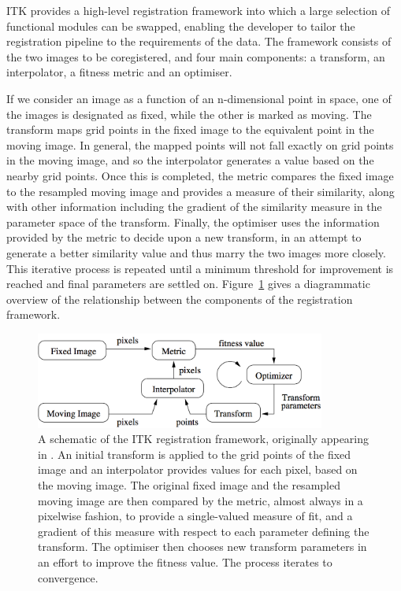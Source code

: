     ITK provides a high-level registration framework into which a large selection of functional modules can be swapped, enabling the developer to tailor the registration pipeline to the requirements of the data. The framework consists of the two images to be coregistered, and four main components: a transform, an interpolator, a fitness metric and an optimiser.

    If we consider an image as a function of an n-dimensional point in space, one of the images is designated as fixed, while the other is marked as moving. The transform maps grid points in the fixed image to the equivalent point in the moving image. In general, the mapped points will not fall exactly on grid points in the moving image, and so the interpolator generates a value based on the nearby grid points. Once this is completed, the metric compares the fixed image to the resampled moving image and provides a measure of their similarity, along with other information including the gradient of the similarity measure in the parameter space of the transform. Finally, the optimiser uses the information provided by the metric to decide upon a new transform, in an attempt to generate a better similarity value and thus marry the two images more closely. This iterative process is repeated until a minimum threshold for improvement is reached and final parameters are settled on. Figure~\ref{fig:framework} gives a diagrammatic overview of the relationship between the components of the registration framework.

    \begin{figure}[htbp]
      \centering
      \includegraphics[width=0.85\textwidth]{Ch2/Figs/framework}
      \caption{A schematic of the ITK registration framework, originally appearing in \cite{ITKGuide}. An initial transform is applied to the grid points of the fixed image and an interpolator provides values for each pixel, based on the moving image. The original fixed image and the resampled moving image are then compared by the metric, almost always in a pixelwise fashion, to provide a single-valued measure of fit, and a gradient of this measure with respect to each parameter defining the transform. The optimiser then chooses new transform parameters in an effort to improve the fitness value. The process iterates to convergence.}
      \label{fig:framework}
    \end{figure}
    
